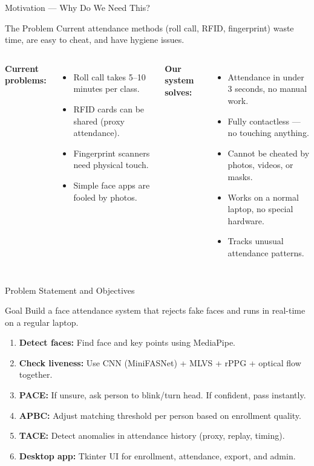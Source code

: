 \documentclass[aspectratio=169,11pt]{beamer}
\begin{document}
\begin{frame}{Motivation --- Why Do We Need This?}\small
\begin{block}{The Problem}
\small Current attendance methods (roll call, RFID, fingerprint) waste time, are easy to cheat, and have hygiene issues.
\end{block}
\begin{columns}[T]
\textbf{Current problems:}\\[2pt]\footnotesize
\begin{itemize}\setlength\itemsep{2pt}
  \item Roll call takes 5--10 minutes per class.
  \item RFID cards can be shared (proxy attendance).
  \item Fingerprint scanners need physical touch.
  \item Simple face apps are fooled by photos.
\end{itemize}
\textbf{Our system solves:}\\[2pt]\footnotesize
\begin{itemize}\setlength\itemsep{2pt}
  \item Attendance in under 3 seconds, no manual work.
  \item Fully contactless --- no touching anything.
  \item Cannot be cheated by photos, videos, or masks.
  \item Works on a normal laptop, no special hardware.
  \item Tracks unusual attendance patterns.
\end{itemize}
\end{columns}
\end{frame}

\begin{frame}{Problem Statement and Objectives}\small
\begin{block}{Goal}
\small Build a face attendance system that rejects fake faces and runs in real-time on a regular laptop.
\end{block}
\footnotesize
\begin{enumerate}\setlength\itemsep{2pt}
  \item \textbf{Detect faces:} Find face and key points using MediaPipe.
  \item \textbf{Check liveness:} Use CNN (MiniFASNet) + MLVS + rPPG + optical flow together.
  \item \textbf{PACE:} If unsure, ask person to blink/turn head. If confident, pass instantly.
  \item \textbf{APBC:} Adjust matching threshold per person based on enrollment quality.
  \item \textbf{TACE:} Detect anomalies in attendance history (proxy, replay, timing).
  \item \textbf{Desktop app:} Tkinter UI for enrollment, attendance, export, and admin.
\end{enumerate}
\end{frame}
\end{document}
